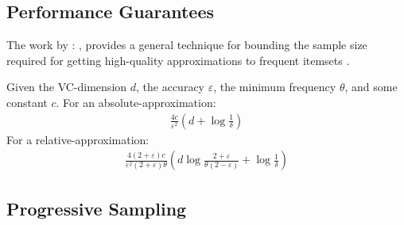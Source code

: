 \documentclass[../main.tex]{subfiles}
\begin{document}
\subsection{Performance Guarantees}
\label{sec:I_performance_guarantees}

The work by \citeauthor{Riondato2012}: ,
provides a general technique for bounding the sample size required for getting high-quality approximations to frequent itemsets \cite{Riondato2012}.

Given the VC-dimension $d$, the accuracy $\varepsilon$, the minimum frequency $\theta$, and some constant $c$.
For an absolute-approximation:
\begin{align*}
    \frac{4c}{\varepsilon^{2}} \left( d + \log \frac{1}{\delta} \right)
\end{align*}
For a relative-approximation:
\begin{align*}
    \frac{4 \left( 2 + \varepsilon \right) c}{\varepsilon^{2} \left( 2 + \varepsilon \right) \theta} \left( d \log \frac{2 + \varepsilon}{\theta \left( 2 - \varepsilon \right)} + \log \frac{1}{\delta} \right)
\end{align*}

\subsection{Progressive Sampling}
\label{sec:I_progressive_sampling}
\end{document}
